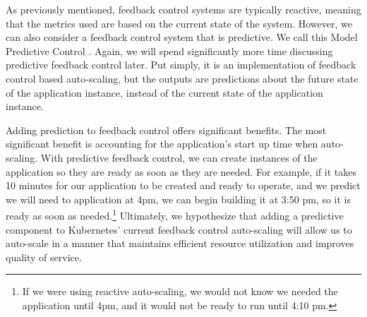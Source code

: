 As previously mentioned, feedback control systems are typically reactive,
meaning that the metrics used are based on the current state of the system.
However, we can also consider a feedback control system that is predictive. We
call this Model Predictive Control
\cite{auto-scaling-techniques-for-elastic-applications-in-cloud-environments}.
Again, we will spend significantly more time discussing predictive feedback
control later. Put simply, it is an implementation of feedback control
based auto-scaling, but the outputs are predictions about the future state of
the application instance, instead of the current state of the application instance.

Adding prediction to feedback control offers significant benefits. The most
significant benefit is accounting for the application's start up time when auto-scaling.
With predictive feedback control, we can create instances of the application
so they are ready as soon as they are needed. For example, if it takes 10
minutes for our application to be created and ready to operate, and we predict
we will need to application at 4pm, we can begin building it at 3:50 pm, so it
is ready as soon as needed.\footnote{If we were using reactive auto-scaling, we
would not know we needed the application until 4pm, and it would not be ready to
run until 4:10 pm.}
Ultimately, we hypothesize that adding a predictive component to
Kubernetes' current feedback control auto-scaling will allow us to auto-scale in
a manner that maintains efficient resource utilization and improves quality of
service.
